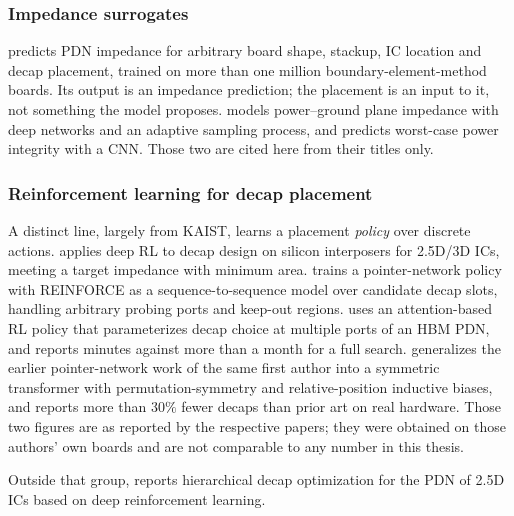\subsubsection*{Impedance surrogates}

\cite{zhang2021fast} predicts PDN impedance for arbitrary board shape, stackup,
IC location and decap placement, trained on more than one million
boundary-element-method boards. Its output is an impedance prediction; the
placement is an input to it, not something the model proposes.
\cite{goay2022adaptive} models power--ground plane impedance with deep networks
and an adaptive sampling process, and \cite{todaes2022worst} predicts worst-case
power integrity with a CNN. Those two are cited here from their titles only.

\subsubsection*{Reinforcement learning for decap placement}

A distinct line, largely from KAIST, learns a placement \emph{policy} over
discrete actions. \cite{park2020drldecap} applies deep RL to decap design on
silicon interposers for 2.5D/3D ICs, meeting a target impedance with minimum
area. \cite{kim2021epeps} trains a pointer-network policy with REINFORCE as a
sequence-to-sequence model over candidate decap slots, handling arbitrary probing
ports and keep-out regions. \cite{park2022transformer} uses an attention-based RL
policy that parameterizes decap choice at multiple ports of an HBM PDN, and
reports minutes against more than a month for a full search.
\cite{kim2023devformer} generalizes the earlier pointer-network work of the same
first author into a symmetric transformer with permutation-symmetry and
relative-position inductive biases, and reports more than $30\%$ fewer decaps
than prior art on real hardware. Those two figures are as reported by the
respective papers; they were obtained on those authors' own boards and are not
comparable to any number in this thesis.

Outside that group, \cite{duan2024hierarchical} reports hierarchical decap
optimization for the PDN of 2.5D ICs based on deep reinforcement learning.

